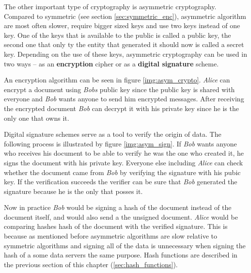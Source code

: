 The other important type of cryptography is asymmetric cryptography. Compared to symmetric (see section \ref{sec:symmetric_enc}), asymmetric algorithm are most often slower, require bigger sized keys and use two keys instead of one key. One of the keys that is available to the public is called a public key, the second one that only ty the entity that generated it should now is called a secret key. Depending on the use of these keys, asymmetric cryptography can be used in two ways -- as an \textbf{encryption} cipher or as a \textbf{digital signature} scheme.

An encryption algorithm can be seen in figure \ref{img:asym_crypto}. \textit{Alice} can encrypt a document using \textit{Bobs} public key since the public key is shared with everyone and \textit{Bob} wants anyone to send him encrypted messages. After receiving the encrypted document \textit{Bob} can decrypt it with his private key since he is the only one that owns it. \cite{Smart2004}


Digital signature schemes serve as a tool to verify the origin of data. The following process is illustrated by figure \ref{img:asym_sign}. If \textit{Bob} wants anyone who receives his document to be able to verify he was the one who created it, he signs the document with his private key. Everyone else including \textit{Alice} can check whether the document came from \textit{Bob} by verifying the signature with his pubic key. If the verification succeeds the verifier can be sure that \textit{Bob} generated the signature because he is the only that posses it. \cite{Paar2010}

Now in practice \textit{Bob} would be signing a hash of the document instead of the document itself, and would also send a the unsigned document. \textit{Alice} would be comparing hashes hash of the document with the verified signature. This is because as mentioned before asymmetric algorithms are slow relative to symmetric algorithms and signing all of the data is unnecessary when signing the hash of a some data servers the same purpose. Hash functions are described in the previous section of this chapter (\ref{sec:hash_functions}).

